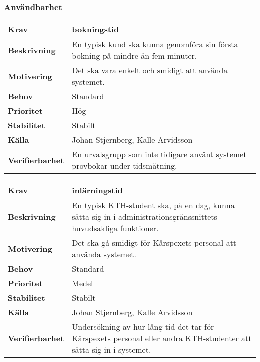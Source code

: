 \documentclass[a4paper, twoside, 11pt, titlepage]{article}
\begin{document}
		\subsubsection{Användbarhet}


		\begin{tabular} { p{2.6cm} p{12.5cm} }
			\hline
			\sffamily\textbf{Krav} & bokningstid  \\
			\hline
			\sffamily\textbf{Beskrivning} & En typisk kund ska kunna genomföra sin första bokning på mindre än fem minuter.  \\
			\hline
			\sffamily\textbf{Motivering} & Det ska vara enkelt och smidigt att använda systemet.  \\
			\hline
			\sffamily\textbf{Behov} & Standard  \\
			\hline
			\sffamily\textbf{Prioritet} & Hög  \\
			\hline
			\sffamily\textbf{Stabilitet} & Stabilt  \\
			\hline
			\sffamily\textbf{Källa} & Johan Stjernberg, Kalle Arvidsson  \\
			\hline
			\sffamily\textbf{Verifierbarhet} & En urvalsgrupp som inte tidigare använt systemet provbokar under tidsmätning.  \\
			\hline
		\end{tabular}
		\vspace{6mm}

		\begin{tabular} { p{2.6cm} p{12.5cm} }
			\hline
			\sffamily\textbf{Krav} & inlärningstid  \\
			\hline
			\sffamily\textbf{Beskrivning} & En typisk KTH-student ska, på en dag, kunna sätta sig in i administrationsgränssnittets huvudsakliga funktioner.  \\
			\hline
			\sffamily\textbf{Motivering} & Det ska gå smidigt för Kårspexets personal att använda systemet.  \\
			\hline
			\sffamily\textbf{Behov} & Standard  \\
			\hline
			\sffamily\textbf{Prioritet} & Medel  \\
			\hline
			\sffamily\textbf{Stabilitet} & Stabilt  \\
			\hline
			\sffamily\textbf{Källa} & Johan Stjernberg, Kalle Arvidsson  \\
			\hline
			\sffamily\textbf{Verifierbarhet} & Undersökning av hur lång tid det tar för Kårspexets personal eller andra KTH-studenter att sätta sig in i systemet.  \\
			\hline
		\end{tabular}
		\vspace{6mm}
\end{document}

